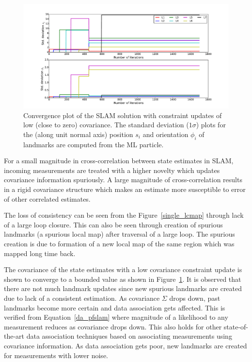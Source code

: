 \begin{figure}
\centering
\hspace*{-1cm}\includegraphics[scale=0.4]{./images/landmark_wn}
\caption[Convergence plot of the SLAM solution with constraint updates of low covariance]{Convergence plot of the SLAM solution with constraint updates of low (close to zero) covariance. The standard deviation ($1\sigma$) plots for the (along unit normal axis) position $s_i$ and orientation $\phi_i$ of landmarks are computed from the ML particle.}
\label{landmark_wn}
\end{figure}

\begin{rem}
For a small magnitude in cross-correlation between state estimates in SLAM, incoming measurements are treated with a higher novelty which updates covariance information spuriously. A large magnitude of cross-correlation results in a rigid covariance structure which makes an estimate more susceptible to error of other correlated estimates. 
\label{rem_corr}
\end{rem}

The loss of consistency can be seen from the Figure~\ref{single_lcmap} through lack of a large loop closure. This can also be seen through creation of spurious landmarks (a spurious local map) after traversal of a large loop. The spurious creation is due to formation of a new local map of the same region which was mapped long time back. 

The covariance of the state estimates with a low covariance constraint update is shown to converge to a bounded value as shown in Figure~\ref{landmark_wn}. It is observed that there are not much landmark updates since new spurious landmarks are created due to lack of a consistent estimation. As covariance $\Sigma$ drops down, past landmarks become more certain and data association gets affected. This is verified from Equation~\ref{da_pfslam} where magnitude of a likelihood to any measurement reduces as covariance drops down. This also holds for other state-of-the-art data association techniques based on associating measurements using covariance information. As data association gets poor, new landmarks are created for measurements with lower noise.


